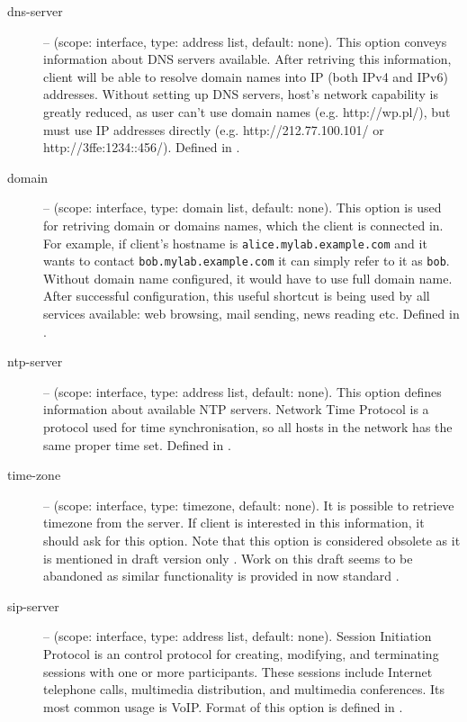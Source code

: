 \begin{description}
 \item[dns-server] -- (scope: interface, type: address list, default:
	    none). This option conveys information about DNS servers
	    available. After retriving this information, client will be
	    able to resolve domain names into IP (both IPv4 and IPv6)
	    addresses. Without setting up DNS servers, host's network
	    capability is greatly reduced, as user can't use domain
	    names (e.g. http://wp.pl/), but must use IP addresses
	    directly (e.g. http://212.77.100.101/ or
	    http://3ffe:1234::456/). Defined in \cite{rfc3596}.
 \item[domain] -- (scope: interface, type: domain list, default:
	    none). This option is used for retriving domain or domains
	    names, which the client is connected in. For example, if
	    client's hostname is \verb+alice.mylab.example.com+ and it wants to
	    contact \verb+bob.mylab.example.com+ it can simply refer to it as
	    \verb+bob+. Without domain name configured, it would have to
	    use full domain name. After successful configuration, this
	    useful shortcut is being used by all services available: web
	    browsing, mail sending, news reading etc. Defined in
	    \cite{rfc3596}.
 \item[ntp-server] -- (scope: interface, type: address list, default:
	    none). This option defines information about available NTP
	    servers. Network Time Protocol \cite{rfc2030} is a protocol used
	    for time synchronisation, so all hosts in the network has
	    the same proper time set. Defined in \cite{rfc4075}.
 \item[time-zone] -- (scope: interface, type: timezone, default:
	    none). It is possible to retrieve timezone from the
	    server. If client is interested in this information, it
	    should ask for this option. Note that this option is
	    considered obsolete as it is mentioned in draft version only
	    \cite{draft-timezone}. Work on this draft seems to be
	    abandoned as similar functionality is provided in now
	    standard \cite{rfc4075}.
 \item[sip-server] -- (scope: interface, type: address list, default:
	    none). Session Initiation Protocol \cite{rfc3263} is an
	    control protocol for creating, modifying, and terminating
	    sessions with one or more participants. These sessions
	    include Internet telephone calls, multimedia distribution,
	    and multimedia conferences. Its most common usage is
	    VoIP. Format of this option is defined in \cite{rfc3319}.

\end{description}
